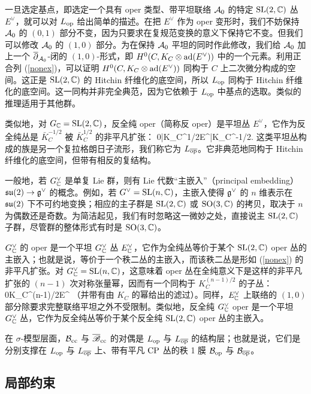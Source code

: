 一旦选定基点，即选定一个具有 oper 类型、带平坦联络 ${\mathcal A}_0$ 的特定 ${\mathrm{SL}}(2,{\mathbb C})$ 丛 $E^\vee$，就可以对 $L_{\mathrm{op}}$ 给出简单的描述。在把 $E^\vee$ 作为 oper 变形时，我们不妨保持 ${\mathcal A}_0$ 的 $(0,1)$ 部分不变，因为只要求在复规范变换的意义下保持它不变。但我们可以修改 ${\mathcal A}_0$ 的 $(1,0)$ 部分。为在保持 ${\mathcal A}_0$ 平坦的同时作此修改，我们给 ${\mathcal A}_0$ 加上一个 $\overline\partial_{{\mathcal A}_0}$-闭的 $(1,0)$-形式，即 $H^0(C,K_C\otimes {\mathrm{ad}}(E^\vee))$ 中的一个元素。利用正合列 (\ref{nonex})，可以证明 $H^0(C,K_C\otimes {\mathrm{ad}}(E^\vee))$ 同构于 $C$ 上二次微分构成的空间。这正是 ${\mathrm{SL}}(2,{\mathbb C})$ 的 Hitchin 纤维化的底空间，所以 $L_{\mathrm{op}}$ 同构于 Hitchin 纤维化的底空间。这一同构并非完全典范，因为它依赖于 $L_{\mathrm{op}}$ 中基点的选取。类似的推理适用于其他群。

类似地，对 $G_{\mathbb C}={\mathrm{SL}}(2,{\mathbb C})$，反全纯 oper（简称反 oper）是平坦丛 $E^\vee$，它作为反全纯丛是 $\bar K_C^{-1/2}$ 被 $\bar K_C^{1/2}$ 的非平凡扩张：
\be\label{onex} 0\to\bar K_C^{1/2}\to E^\vee \to \bar K_C^{-1/2}. \ee
这类平坦丛构成的族是另一个复拉格朗日子流形，我们称它为 $L_{\overline{\mathrm{op}}}$。它非典范地同构于 Hitchin 纤维化的底空间，但带有相反的复结构。

一般地，若 $G_{\mathbb C}^\vee$ 是单复 Lie 群，则有 Lie 代数“主嵌入”（principal embedding）${{\mathfrak {su}}}(2)\to {{\mathfrak g}^\vee}$ 的概念。例如，若 $G^\vee={\mathrm{SL}}(n,{\mathbb C})$，主嵌入使得 ${\mathfrak g}^\vee$ 的 $n$ 维表示在 ${\mathfrak {su}}(2)$ 下不可约地变换；相应的主子群是 ${\mathrm{SL}}(2,{\mathbb C})$ 或 ${\mathrm{SO}}(3,{\mathbb C})$ 的拷贝，取决于 $n$ 为偶数还是奇数。为简洁起见，我们有时忽略这一微妙之处，直接说主 ${\mathrm{SL}}(2,{\mathbb C})$ 子群，尽管群的整体形式有时是 ${\mathrm{SO}}(3,{\mathbb C})$。

$G_{\mathbb C}^\vee$ 的 oper 是一个平坦 $G_{\mathbb C}^\vee$ 丛 $E_{\mathbb C}^\vee$，它作为全纯丛等价于某个 ${\mathrm{SL}}(2,{\mathbb C})$ oper 丛的主嵌入；也就是说，等价于一个秩二丛的主嵌入，而该秩二丛是形如 (\ref{nonex}) 的非平凡扩张。对 $G^\vee_{\mathbb C}={\mathrm{SL}}(n,{\mathbb C})$，这意味着 oper 丛在全纯意义下是这样的非平凡扩张的 $(n-1)$ 次对称张量幂，因而有一个同构于 $K_C^{(n-1)/2}$ 的子丛：
\be\label{nex}0\to K_C^{(n-1)/2}\to E^\vee\to \cdots \ee
（并带有由 $K_C$ 的幂给出的滤过）。同样，$E_{\mathbb C}^\vee$ 上联络的 $(1,0)$ 部分除要求完整联络平坦之外不受限制。类似地，反全纯 $G_{\mathbb C}^\vee$ oper 是一个平坦 $G_{\mathbb C}^\vee$ 丛，它作为反全纯丛等价于某个反全纯 ${\mathrm{SL}}(2,{\mathbb C})$ oper 丛的主嵌入。

在 $\sigma$-模型层面，${\mathcal B}_{\mathrm{cc}}$ 与 ${\overline {\mathscr B}}_{\mathrm{cc}}$ 的对偶是 $L_{\mathrm{op}}$ 与 $L_{\overline{\mathrm{op}}}$ 的结构层；也就是说，它们是分别支撑在 $L_{\mathrm{op}}$ 与 $L_{\overline{\mathrm{op}}}$ 上、带有平凡 ${\mathrm{CP}}$ 丛的秩 1 膜 ${\mathcal B}_{\mathrm{op}}$ 与 ${\mathcal B}_{\overline{\mathrm{op}}}$。

\subsection{局部约束}\label{localoper}

